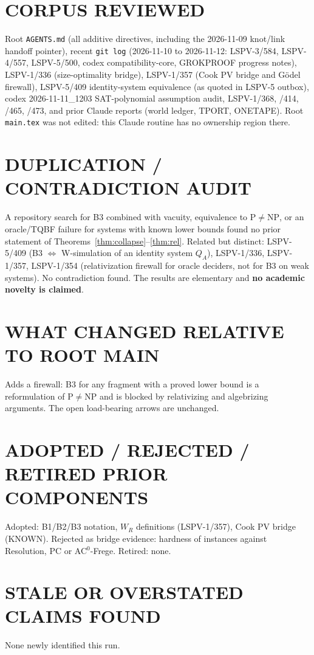 \documentclass[11pt]{article}
\theoremstyle{definition}
\begin{document}
\section*{CORPUS REVIEWED}
Root \texttt{AGENTS.md} (all additive directives, including the 2026-11-09 knot/link handoff pointer), recent \texttt{git log} (2026-11-10 to 2026-11-12: LSPV-3/584, LSPV-4/557, LSPV-5/500, codex compatibility-core, GROKPROOF progress notes), LSPV-1/336 (size-optimality bridge), LSPV-1/357 (Cook PV bridge and G\"odel firewall), LSPV-5/409 identity-system equivalence (as quoted in LSPV-5 outbox), codex 2026-11-11\_1203 SAT-polynomial assumption audit, LSPV-1/368, /414, /465, /473, and prior Claude reports (world ledger, TPORT, ONETAPE). Root \texttt{main.tex} was not edited: this Claude routine has no ownership region there.

\section*{DUPLICATION / CONTRADICTION AUDIT}
A repository search for B3 combined with vacuity, equivalence to $\mathrm{P}\ne\mathrm{NP}$, or an oracle/TQBF failure for systems with known lower bounds found no prior statement of Theorems~\ref{thm:collapse}--\ref{thm:rel}. Related but distinct: LSPV-5/409 (B3 $\iff$ W-simulation of an identity system $Q_A$), LSPV-1/336, LSPV-1/357, LSPV-1/354 (relativization firewall for oracle deciders, not for B3 on weak systems). No contradiction found. The results are elementary and \textbf{no academic novelty is claimed}.

\section*{WHAT CHANGED RELATIVE TO ROOT MAIN}
Adds a firewall: B3 for any fragment with a proved lower bound is a reformulation of $\mathrm{P}\ne\mathrm{NP}$ and is blocked by relativizing and algebrizing arguments. The open load-bearing arrows are unchanged.

\section*{ADOPTED / REJECTED / RETIRED PRIOR COMPONENTS}
Adopted: B1/B2/B3 notation, $W_R$ definitions (LSPV-1/357), Cook PV bridge (KNOWN). Rejected as bridge evidence: hardness of instances against Resolution, PC or AC$^0$-Frege. Retired: none.

\section*{STALE OR OVERSTATED CLAIMS FOUND}
None newly identified this run.
\end{document}
